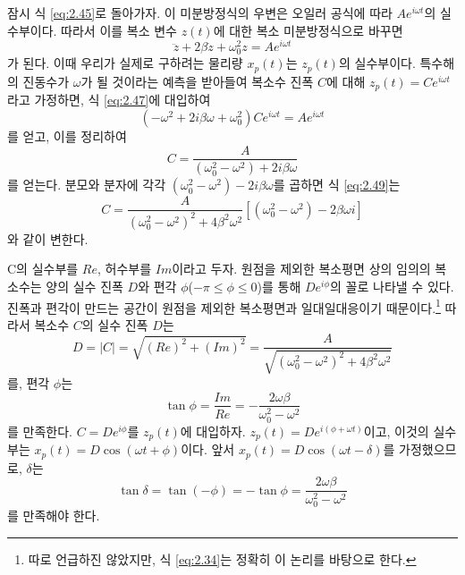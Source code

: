\documentclass[chapter, oneside, b5paper]{oblivoir}
\theoremstyle{plain}
\theoremstyle{definition}
\theoremstyle{remark}
\begin{document}
잠시 식 \ref{eq:2.45}로 돌아가자. 이 미분방정식의 우변은 오일러 공식에 따라 $Ae^{i\omega t}$의 실수부이다. 따라서 이를 복소 변수 $z(t)$에 대한 복소 미분방정식으로 바꾸면
\begin{equation}
    \ddot{z} + 2\beta \dot{z} + \omega_0^2 z = A e^{i\omega t} \label{eq:2.47}
\end{equation}
가 된다. 이때 우리가 실제로 구하려는 물리량 $x_p(t)$는 $z_p(t)$의 실수부이다. 특수해의 진동수가 $\omega$가 될 것이라는 예측을 받아들여 복소수 진폭 $C$에 대해 $z_p(t) = Ce^{i\omega t}$라고 가정하면, 식 \ref{eq:2.47}에 대입하여
\begin{equation}
    (-\omega^2+2i\beta\omega + \omega_0^2)Ce^{i\omega t} = Ae^{i\omega t} \label{eq:2.48}
\end{equation}
를 얻고, 이를 정리하여
\begin{equation}
    C = \frac{A}{(\omega_0^2-\omega^2)+2i\beta\omega} \label{eq:2.49}
\end{equation}
를 얻는다. 분모와 분자에 각각 $(\omega_0^2-\omega^2)-2i\beta\omega$를 곱하면 식 \ref{eq:2.49}는
\begin{equation}
    C = \frac{A}{(\omega_0^2-\omega^2)^2+4\beta^2\omega^2}[(\omega_0^2-\omega^2)-2\beta\omega i] \label{eq:2.50}
\end{equation}
와 같이 변한다.

C의 실수부를 $Re$, 허수부를 $Im$이라고 두자. 원점을 제외한 복소평면 상의 임의의 복소수는 양의 실수 진폭 $D$와 편각 $\phi$($-\pi \le \phi \le 0$)를 통해 $De^{i\phi}$의 꼴로 나타낼 수 있다. 진폭과 편각이 만드는 공간이 원점을 제외한 복소평면과 일대일대응이기 때문이다.\footnote{따로 언급하진 않았지만, 식 \ref{eq:2.34}는 정확히 이 논리를 바탕으로 한다.} 따라서 복소수 $C$의 실수 진폭 $D$는
\begin{equation} 
    D = |C| = \sqrt{(Re)^2 + (Im)^2} = \frac{A}{\sqrt{(\omega_0^2-\omega^2)^2+4\beta^2 \omega^2}} \label{eq:2.51}
\end{equation}를, 편각 $\phi$는
\begin{equation}
    \tan{\phi} = \frac{Im}{Re}=-\frac{2\omega \beta}{\omega_0^2-\omega^2} \label{eq:2.52}
\end{equation}
를 만족한다. $C=De^{i\phi}$를 $z_p(t)$에 대입하자.  $z_p(t)=De^{i(\phi+\omega t)}$이고, 이것의 실수부는 $x_p(t)=D\cos{(\omega t + \phi)}$이다. 앞서 $x_p(t)=D\cos{(\omega t - \delta)}$를 가정했으므로, $\delta$는
\begin{equation}
    \tan{\delta} = \tan{(-\phi)} = -\tan{\phi} = \frac{2\omega \beta}{\omega_0^2-\omega^2} \label{eq:2.53}
\end{equation}
를 만족해야 한다.
\end{document}
